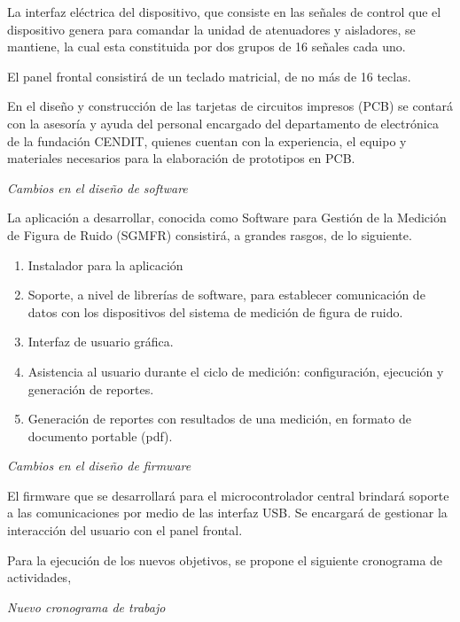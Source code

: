 \documentclass[paper=letter,oneside,fontsize=12pt, parskip=full]{article}
\begin{document}
	La interfaz eléctrica del dispositivo, que consiste en las señales de control que el dispositivo genera para comandar la unidad de atenuadores y aisladores, se mantiene, la cual esta constituida por dos grupos de 16 señales cada uno. 
	
	El panel frontal consistirá de un teclado matricial, de no más de 16 teclas. 
	
	En el diseño y construcción de las tarjetas de circuitos impresos (PCB) se contará con la asesoría y ayuda del personal encargado del departamento de electrónica de la fundación CENDIT, quienes cuentan con la experiencia, el equipo y materiales necesarios para la elaboración de prototipos en PCB.
	
	\emph{Cambios en el diseño de software}
	
	La aplicación a desarrollar, conocida como Software para Gestión de la Medición de Figura de Ruido (SGMFR) consistirá, a grandes rasgos, de lo siguiente.
	
	\begin{enumerate}
		\item Instalador para la aplicación
		\item Soporte, a nivel de librerías de software, para establecer comunicación de datos con los dispositivos del sistema de medición de figura de ruido.
		\item Interfaz de usuario gráfica.
		\item Asistencia al usuario durante el ciclo de medición: configuración, ejecución y generación de reportes.
		\item Generación de reportes con resultados de una medición, en formato de documento portable (pdf).
	\end{enumerate}

	\emph{Cambios en el diseño de firmware}
	
	El firmware que se desarrollará para el microcontrolador central brindará soporte a las comunicaciones por medio de las interfaz USB. Se encargará de gestionar la interacción del usuario con el panel frontal. 	
	
	Para la ejecución de los nuevos objetivos, se propone el siguiente cronograma de actividades,
	
	\newpage
	
	\emph{Nuevo cronograma de trabajo}
\end{document}
